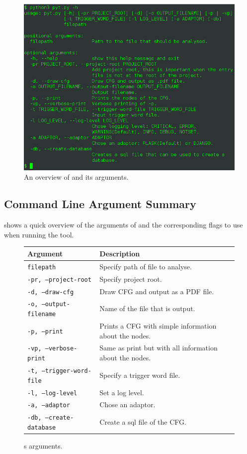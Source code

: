 \begin{figure}
  \includegraphics[width=\textwidth]{./figures/pyt_overview.png}
  \caption{An overview of \pyt{} and its arguments.}
  \label{tool_overview}
\end{figure}


\subsection{Command Line Argument Summary}
 shows a quick overview of the arguments of \pyt{} and the corresponding flags to use when running the tool.

\newcommand{\pytarg}[2]{
  \texttt{#1} & #2.
}
\begin{figure}
  \begin{tabular}{l | l}
    \textbf{Argument} & \textbf{Description} \\
    \hline
    \pytarg{filepath}{Specify path of file to analyse} \\
    \pytarg{-pr, --project-root}{Specify project root} \\
    \pytarg{-d, --draw-cfg}{Draw CFG and output as a PDF file} \\
    \pytarg{-o, --output-filename}{Name of the file that is output} \\
    \pytarg{-p, --print}{Prints a CFG with simple information about the nodes} \\
    \pytarg{-vp, --verbose-print}{Same as print but with all information about the nodes} \\
    \pytarg{-t, --trigger-word-file}{Specify a trigger word file} \\
    \pytarg{-l, --log-level}{Set a log level} \\
    \pytarg{-a, --adaptor}{Chose an adaptor} \\
    \pytarg{-db, --create-database}{Create a sql file of the CFG} \\
    
\end{tabular}
  \centering
  \caption{\pyt{}s arguments.}
  \label{pyt:arguments_overview}
\end{figure}
